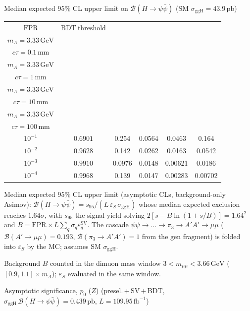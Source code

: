 \documentclass[10pt,a4paper]{article}
\begin{document}
{\vspace{12pt}

Median expected $95\%$ CL upper limit on $\mathcal{B}(H\to\psi\bar{\psi})$ (SM $\sigma_{\mathrm{ggH}}=43.9\,\mathrm{pb}$)

\begin{tabular}{cccccc}
\toprule
$\mathrm{FPR}$ & $\mathrm{BDT\ threshold}$ & \shortstack{$m_{\pi}=10\,\mathrm{GeV}$\\$m_{A}=3.33\,\mathrm{GeV}$\\$c\tau=0.1\,\mathrm{mm}$} & \shortstack{$m_{\pi}=10\,\mathrm{GeV}$\\$m_{A}=3.33\,\mathrm{GeV}$\\$c\tau=1\,\mathrm{mm}$} & \shortstack{$m_{\pi}=10\,\mathrm{GeV}$\\$m_{A}=3.33\,\mathrm{GeV}$\\$c\tau=10\,\mathrm{mm}$} & \shortstack{$m_{\pi}=10\,\mathrm{GeV}$\\$m_{A}=3.33\,\mathrm{GeV}$\\$c\tau=100\,\mathrm{mm}$} \\
\midrule
$10^{-1}$ & $0.6901$ & 0.254 & 0.0564 & 0.0463 & 0.164\\
$10^{-2}$ & $0.9628$ & 0.142 & 0.0262 & 0.0163 & 0.0542\\
$10^{-3}$ & $0.9910$ & 0.0976 & 0.0148 & 0.00621 & 0.0186\\
$10^{-4}$ & $0.9968$ & 0.139 & 0.0147 & 0.00283 & 0.00702\\
\bottomrule
\end{tabular}

{\small Median expected $95\%$ CL upper limit (asymptotic CLs, background-only Asimov): $\mathcal{B}(H\to\psi\bar{\psi})=s_{95}/(L\,\varepsilon_S\,\sigma_{\mathrm{ggH}})$ whose median expected exclusion reaches $1.64\sigma$, with $s_{95}$ the signal yield solving $2[s-B\ln(1{+}s/B)]=1.64^2$ and $B=\mathrm{FPR}\times L\sum_q\sigma_q\varepsilon_q^{\mathrm{SV}}$. The cascade $\psi\bar{\psi}\to\ldots\to\pi_3\to A'A'\to\mu\mu$ ($\mathcal{B}(A'\to\mu\mu)=0.193$, $\mathcal{B}(\pi_3\to A'A')=1$ from the gen fragment) is folded into $\varepsilon_S$ by the MC; assumes SM $\sigma_{\mathrm{ggH}}$.}

{\small Background $B$ counted in the dimuon mass window $3<m_{\mu\mu}<3.66\,\mathrm{GeV}$ ($[0.9,1.1]\times m_A$); $\varepsilon_S$ evaluated in the same window.}

\vspace{12pt}

Asymptotic significance, $p_0$ ($Z$) (presel.\,$+$\,SV\,$+$\,BDT, $\sigma_{\mathrm{ggH}}\,\mathcal{B}(H\to\psi\bar{\psi})=0.439\,\mathrm{pb}$, $L=109.95\,\mathrm{fb}^{-1}$)

}
\end{document}
